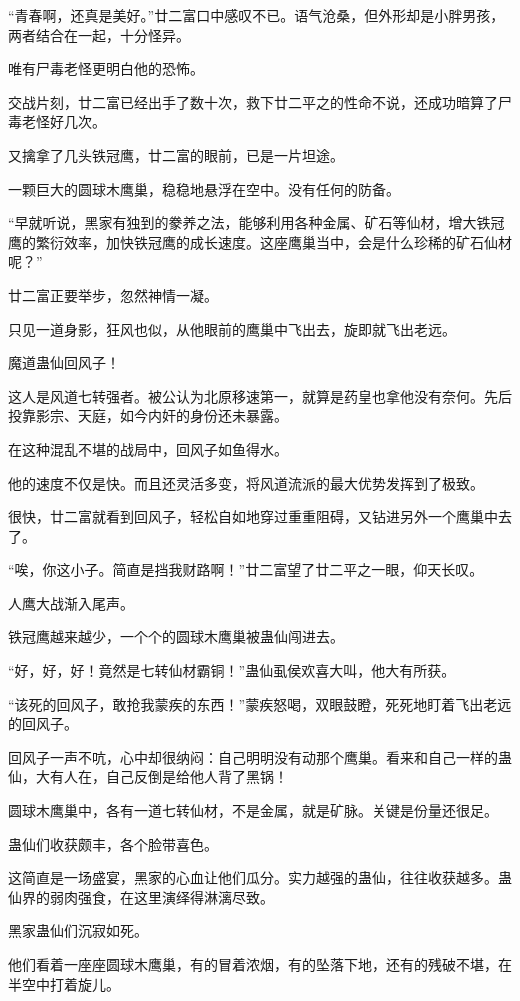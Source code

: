 \begin{this_body}
“青春啊，还真是美好。”廿二富口中感叹不已。语气沧桑，但外形却是小胖男孩，两者结合在一起，十分怪异。

唯有尸毒老怪更明白他的恐怖。

交战片刻，廿二富已经出手了数十次，救下廿二平之的性命不说，还成功暗算了尸毒老怪好几次。

又擒拿了几头铁冠鹰，廿二富的眼前，已是一片坦途。

一颗巨大的圆球木鹰巢，稳稳地悬浮在空中。没有任何的防备。

“早就听说，黑家有独到的豢养之法，能够利用各种金属、矿石等仙材，增大铁冠鹰的繁衍效率，加快铁冠鹰的成长速度。这座鹰巢当中，会是什么珍稀的矿石仙材呢？”

廿二富正要举步，忽然神情一凝。

只见一道身影，狂风也似，从他眼前的鹰巢中飞出去，旋即就飞出老远。

魔道蛊仙回风子！

这人是风道七转强者。被公认为北原移速第一，就算是药皇也拿他没有奈何。先后投靠影宗、天庭，如今内奸的身份还未暴露。

在这种混乱不堪的战局中，回风子如鱼得水。

他的速度不仅是快。而且还灵活多变，将风道流派的最大优势发挥到了极致。

很快，廿二富就看到回风子，轻松自如地穿过重重阻碍，又钻进另外一个鹰巢中去了。

“唉，你这小子。简直是挡我财路啊！”廿二富望了廿二平之一眼，仰天长叹。

人鹰大战渐入尾声。

铁冠鹰越来越少，一个个的圆球木鹰巢被蛊仙闯进去。

“好，好，好！竟然是七转仙材霸铜！”蛊仙虱侯欢喜大叫，他大有所获。

“该死的回风子，敢抢我蒙疾的东西！”蒙疾怒喝，双眼鼓瞪，死死地盯着飞出老远的回风子。

回风子一声不吭，心中却很纳闷：自己明明没有动那个鹰巢。看来和自己一样的蛊仙，大有人在，自己反倒是给他人背了黑锅！

圆球木鹰巢中，各有一道七转仙材，不是金属，就是矿脉。关键是份量还很足。

蛊仙们收获颇丰，各个脸带喜色。

这简直是一场盛宴，黑家的心血让他们瓜分。实力越强的蛊仙，往往收获越多。蛊仙界的弱肉强食，在这里演绎得淋漓尽致。

黑家蛊仙们沉寂如死。

他们看着一座座圆球木鹰巢，有的冒着浓烟，有的坠落下地，还有的残破不堪，在半空中打着旋儿。


\end{this_body}
